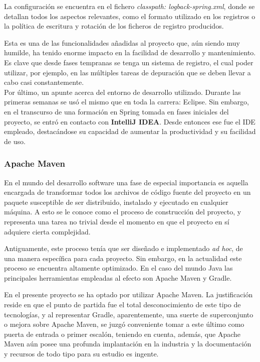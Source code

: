 \documentclass[a4paper]{article}
\begin{document}
    La configuración se encuentra en el fichero \emph{classpath: logback-spring.xml}, donde se detallan todos los aspectos relevantes, como el formato utilizado en los registros o la política de escritura y rotación de los ficheros de registro producidos.
    
    Esta es una de las funcionalidades añadidas al proyecto que, aún siendo muy humilde, ha tenido enorme impacto en la facilidad de desarrollo y mantenimiento. Es clave que desde fases tempranas se tenga un sistema de registro, el cual poder utilizar, por ejemplo, en las múltiples tareas de depuración que se deben llevar a cabo casi constantemente.
    \\
    
    Por último, un apunte acerca del entorno de desarrollo utilizado. Durante las primeras semanas se usó el mismo que en toda la carrera: Eclipse. Sin embargo, en el transcurso de una formación en Spring tomada en fases iniciales del proyecto, se entró en contacto con \textbf{IntelliJ IDEA}. Desde entonces ese fue el IDE empleado, destacándose su capacidad de aumentar la productividad y su facilidad de uso.
    
    \subsubsection{Apache Maven}
    En el mundo del desarrollo software una fase de especial importancia es aquella encargada de transformar todos los archivos de código fuente del proyecto en un paquete susceptible de ser distribuido, instalado y ejecutado en cualquier máquina. A esto se le conoce como el proceso de construcción del proyecto, y representa una tarea no trivial desde el momento en que el proyecto en sí adquiere cierta complejidad.
    
    Antiguamente, este proceso tenía que ser diseñado e implementado \emph{ad hoc}, de una manera específica para cada proyecto. Sin embargo, en la actualidad este proceso se encuentra altamente optimizado. En el caso del mundo Java las principales herramientas empleadas al efecto son Apache Maven y Gradle.
    
    En el presente proyecto se ha optado por utilizar Apache Maven. La justificación reside en que el punto de partida fue el total desconocimiento de este tipo de tecnologías, y al representar Gradle, aparentemente, una suerte de superconjunto o mejora sobre Apache Maven, se juzgó conveniente tomar a este último como puerta de entrada o primer escalón, teniendo en cuenta, además, que Apache Maven aún posee una profunda implantación en la industria y la documentación y recursos de todo tipo para su estudio es ingente.
    
\end{document}
